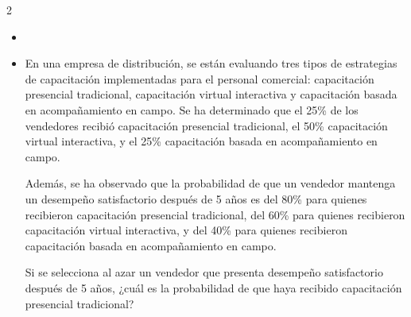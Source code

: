 \documentclass[10pt,letterpaper]{article}
\begin{document}
\begin{multicols}{2}
\begin{itemize}
\item[1.] 



\item[2.] En una empresa de distribución, se están evaluando tres tipos de estrategias de capacitación implementadas para el personal comercial: capacitación presencial tradicional, capacitación virtual interactiva y capacitación basada en acompañamiento en campo. Se ha determinado que el 25\% de los vendedores recibió capacitación presencial tradicional, el 50\% capacitación virtual interactiva, y el 25\% capacitación basada en acompañamiento en campo.

Además, se ha observado que la probabilidad de que un vendedor mantenga un desempeño satisfactorio después de 5 años es del 80\% para quienes recibieron capacitación presencial tradicional, del 60\% para quienes recibieron capacitación virtual interactiva, y del 40\% para quienes recibieron capacitación basada en acompañamiento en campo.

Si se selecciona al azar un vendedor que presenta desempeño satisfactorio después de 5 años, ¿cuál es la probabilidad de que haya recibido capacitación presencial tradicional?

\end{itemize}
\end{multicols}
\end{document}

